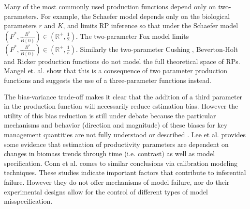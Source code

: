 \documentclass[12pt]{ucscthesis}
\begin{document}
%
Many of the most commonly used production functions depend only
on two-parameters. For example, the Schaefer model %
depends only on the biological parameters $r$ and $K$, and limits RP inference
so that under the Schaefer model $\left(F^*, \frac{B^*}{\bar B(0)}\right)\in \left(\mathbb{R}^+, \frac{1}{2}\right)$.
The two-parameter Fox model \cite{fox_jr_exponential_1970} limits $\left(F^*, \frac{B^*}{\bar B(0)}\right)\in \left(\mathbb{R}^+, \frac{1}{e}\right)$.
Similarly the two-parameter Cushing \cite{cushing_dependence_1971, cushing_dependence_1973}, Beverton-Holt \cite[BH]{beverton_dynamics_1957}
and Ricker \cite{ricker_stock_1954} production functions do not model the full theoretical space of
RPs. Mangel et. al. \cite{mangel_perspective_2013} show that this is a 
consequence of two parameter production functions and suggests the use of a 
three-parameter functions instead. 

%
The bias-variance trade-off \cite{ramasubramanian_machine_2017} makes it
clear that the addition of a third parameter in the production function will
necessarily reduce estimation bias. However the utility of this bias reduction
is still under debate because the particular mechanisms and behavior (direction and magnitude) %
of these biases for key management quantities %
are not fully understood or described \cite{munyandorero_analytical_2023}. Lee et al. \cite{lee_can_2012} provides some
evidence that estimation of productivity parameters %
are dependent on changes in biomass trends through time (i.e. contrast) as well %
as model specification. Conn et al. \cite{conn_when_2010} comes to similar conclusions %
via calibration modeling techniques. These studies indicate important factors that
contribute to inferential failure. However they do not offer mechanisms of model
failure, nor do their experimental designs allow for the control of different
types of model misspecification.
\end{document}
